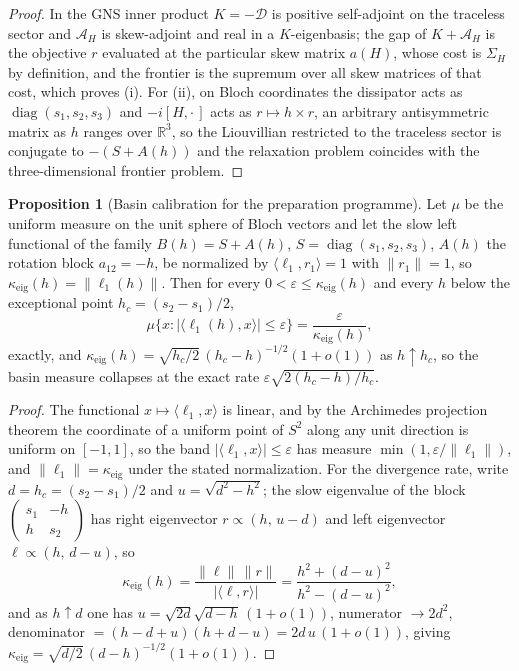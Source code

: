 \documentclass[11pt]{article}
\theoremstyle{definition}
\newcommand{\R}{\mathbb R}
\newcommand{\eps}{\varepsilon}
\providecommand{\R}{\mathbb R}
\newtheorem{proposition}{Proposition}
\begin{document}
\begin{proof}
In the GNS inner product $K=-\mathcal D$ is positive self-adjoint on the traceless sector and $\mathcal A_H$ is skew-adjoint and real in a $K$-eigenbasis; the gap of $K+\mathcal A_H$ is the objective $r$ evaluated at the particular skew matrix $a(H)$, whose cost is $\Sigma_H$ by definition, and the frontier is the supremum over all skew matrices of that cost, which proves (i).  For (ii), on Bloch coordinates the dissipator acts as $\operatorname{diag}(s_1,s_2,s_3)$ and $-i[H,\cdot\,]$ acts as $r\mapsto h\times r$, an arbitrary antisymmetric matrix as $h$ ranges over $\R^3$, so the Liouvillian restricted to the traceless sector is conjugate to $-(S+A(h))$ and the relaxation problem coincides with the three-dimensional frontier problem.
\end{proof}

\begin{proposition}[Basin calibration for the preparation programme]\label{ag:basin}
Let $\mu$ be the uniform measure on the unit sphere of Bloch vectors and let the slow left functional of the family $B(h)=S+A(h)$, $S=\operatorname{diag}(s_1,s_2,s_3)$, $A(h)$ the rotation block $a_{12}=-h$, be normalized by $\langle\ell_1,r_1\rangle=1$ with $\|r_1\|=1$, so $\kappa_{\mathrm{eig}}(h)=\|\ell_1(h)\|$.  Then for every $0<\eps\le\kappa_{\mathrm{eig}}(h)$ and every $h$ below the exceptional point $h_c=(s_2-s_1)/2$,
\[
\mu\{x:|\langle\ell_1(h),x\rangle|\le\eps\}=\frac{\eps}{\kappa_{\mathrm{eig}}(h)},
\]
exactly, and $\kappa_{\mathrm{eig}}(h)=\sqrt{h_c/2}\,(h_c-h)^{-1/2}(1+o(1))$ as $h\uparrow h_c$, so the basin measure collapses at the exact rate $\eps\sqrt{2(h_c-h)/h_c}$.
\end{proposition}

\begin{proof}
The functional $x\mapsto\langle\ell_1,x\rangle$ is linear, and by the Archimedes projection theorem the coordinate of a uniform point of $S^2$ along any unit direction is uniform on $[-1,1]$, so the band $|\langle\ell_1,x\rangle|\le\eps$ has measure $\min(1,\eps/\|\ell_1\|)$, and $\|\ell_1\|=\kappa_{\mathrm{eig}}$ under the stated normalization.  For the divergence rate, write $d=h_c=(s_2-s_1)/2$ and $u=\sqrt{d^2-h^2}$; the slow eigenvalue of the block $\begin{pmatrix}s_1&-h\\h&s_2\end{pmatrix}$ has right eigenvector $r\propto(h,\,u-d)$ and left eigenvector $\ell\propto(h,\,d-u)$, so
\[
\kappa_{\mathrm{eig}}(h)=\frac{\|\ell\|\,\|r\|}{|\langle\ell,r\rangle|}=\frac{h^2+(d-u)^2}{h^2-(d-u)^2},
\]
and as $h\uparrow d$ one has $u=\sqrt{2d}\sqrt{d-h}\,(1+o(1))$, numerator $\to2d^2$, denominator $=(h-d+u)(h+d-u)=2d\,u\,(1+o(1))$, giving $\kappa_{\mathrm{eig}}=\sqrt{d/2}\,(d-h)^{-1/2}(1+o(1))$.
\end{proof}
\end{document}
